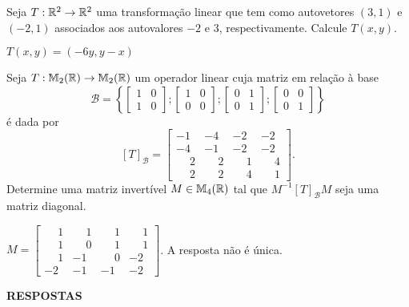 \documentclass[12pt]{exam}
\begin{document}
\begin{exercicio}
  Seja $T : \mathbb{R}^2 \to \mathbb{R}^2$ uma transformação linear que tem como autovetores $(3,1)$ e $(-2,1)$ associados aos autovalores $-2$ e $3$, respectivamente. Calcule $T(x,y)$.
  \begin{solucao}
    $T(x,y) = (-6y, y -x)$
  \end{solucao}
\end{exercicio}

\begin{exercicio}
  Seja $T : \mathbb{M}_2(\mathbb{R}) \to \mathbb{M}_2(\mathbb{R})$ um operador linear cuja matriz em relação à base
  \[
    \mathcal{B} = \left\{\begin{bmatrix}1 & 0\\ 1 & 0\end{bmatrix}; \begin{bmatrix}1 & 0\\ 0 & 0\end{bmatrix}; \begin{bmatrix}0 & 1\\ 0 & 1\end{bmatrix}; \begin{bmatrix}0 & 0\\ 0 & 1\end{bmatrix}\right\}
  \]
  é dada por
  \[
    [T]_\mathcal{B} = \begin{bmatrix}
      -1 & -4 & -2 & -2\\
      -4 & -1 & -2 & -2\\
      \phantom{-} 2 & \phantom{-} 2 & \phantom{-} 1 & \phantom{-} 4\\
      \phantom{-} 2 & \phantom{-} 2 & \phantom{-} 4 & \phantom{-} 1
    \end{bmatrix}.
  \]
  Determine uma matriz invertível $M \in \mathbb{M}_4(\mathbb{R})$ tal que $M^{-1}[T]_\mathcal{B}M$ seja uma matriz diagonal.
\begin{solucao}
  $M = \begin{bmatrix}
    \phantom{-} 1 & \phantom{-} 1 & \phantom{-} 1 & \phantom{-} 1\\
    \phantom{-} 1 & \phantom{-} 0 & \phantom{-} 1 & \phantom{-} 1\\
    \phantom{-} 1 & -1 & \phantom{-} 0 & -2\\
    -2 & -1 & -1 & -2
  \end{bmatrix}$. A resposta não é única.
\end{solucao}
\end{exercicio}

\newpage
{}

\begin{center}
    {\large\bf RESPOSTAS}
\end{center}


\end{document}
